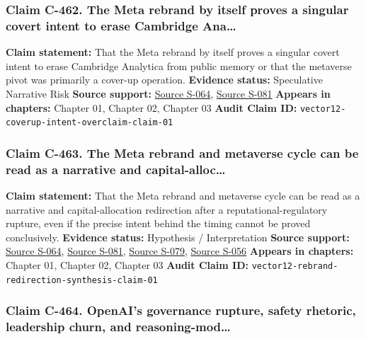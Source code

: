 \documentclass[
  american,
  11pt,
  letterpaper,
]{article}
\begin{document}
\subsubsection{Claim C-462. The Meta rebrand by itself proves a singular
covert intent to erase Cambridge
Ana\ldots{}}\label{claim-c-462-the-meta-rebrand-by-itself-proves-a-singular-covert-intent-to-erase-cambridge-ana}

\textbf{Claim statement:} That the Meta rebrand by itself proves a
singular covert intent to erase Cambridge Analytica from public memory
or that the metaverse pivot was primarily a cover-up operation.
\textbf{Evidence status:} Speculative Narrative Risk \textbf{Source
support:}
\hyperref[source-s-064-ftc-imposes-5-billion-penalty-and-sweeping-new-privacy-restrictions-on-facebook]{Source
S-064}, \hyperref[source-s-081-the-facebook-company-is-now-meta]{Source
S-081} \textbf{Appears in chapters:} Chapter 01, Chapter 02, Chapter 03
\textbf{Audit Claim ID:}
\texttt{vector12-coverup-intent-overclaim-claim-01}

\subsubsection{Claim C-463. The Meta rebrand and metaverse cycle can be
read as a narrative and
capital-alloc\ldots{}}\label{claim-c-463-the-meta-rebrand-and-metaverse-cycle-can-be-read-as-a-narrative-and-capital-alloc}

\textbf{Claim statement:} That the Meta rebrand and metaverse cycle can
be read as a narrative and capital-allocation redirection after a
reputational-regulatory rupture, even if the precise intent behind the
timing cannot be proved conclusively. \textbf{Evidence status:}
Hypothesis / Interpretation \textbf{Source support:}
\hyperref[source-s-064-ftc-imposes-5-billion-penalty-and-sweeping-new-privacy-restrictions-on-facebook]{Source
S-064}, \hyperref[source-s-081-the-facebook-company-is-now-meta]{Source
S-081},
\hyperref[source-s-079-meta-platforms-inc-2023-annual-report-form-10-k]{Source
S-079},
\hyperref[source-s-056-meta-sees-ai-spending-accelerating-as-earnings-top-forecasts]{Source
S-056} \textbf{Appears in chapters:} Chapter 01, Chapter 02, Chapter 03
\textbf{Audit Claim ID:}
\texttt{vector12-rebrand-redirection-synthesis-claim-01}

\subsubsection{Claim C-464. OpenAI's governance rupture, safety
rhetoric, leadership churn, and
reasoning-mod\ldots{}}\label{claim-c-464-openai-s-governance-rupture-safety-rhetoric-leadership-churn-and-reasoning-mod}
\end{document}
